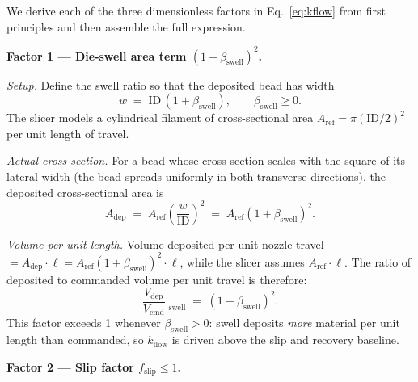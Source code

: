 \documentclass[11pt,a4paper]{article}
\begin{document}
\begin{derivationbox}[title={DERIVATION --- Each factor in $k_\mathrm{flow}=(1+\beta_\mathrm{swell})^2 f_\mathrm{slip}\sqrt{R_\mathrm{rec}}$}]
We derive each of the three dimensionless factors in Eq.~\ref{eq:kflow}
from first principles and then assemble the full expression.

\medskip\noindent\textbf{Factor 1 --- Die-swell area term
$(1+\beta_\mathrm{swell})^{2}$.}

\emph{Setup.} Define the swell ratio so that the deposited bead has
width
\begin{equation}
w \;=\; \mathrm{ID}\,(1+\beta_\mathrm{swell}),
\qquad \beta_\mathrm{swell}\geq 0.
\label{eq:swell_width}
\end{equation}
The slicer models a cylindrical filament of cross-sectional area
$A_\mathrm{ref}=\pi(\mathrm{ID}/2)^{2}$ per unit length of travel.

\emph{Actual cross-section.}
For a bead whose cross-section scales with the square of its lateral
width (the bead spreads uniformly in both transverse directions), the
deposited cross-sectional area is
\begin{equation}
A_\mathrm{dep}
\;=\; A_\mathrm{ref}\left(\frac{w}{\mathrm{ID}}\right)^{2}
\;=\; A_\mathrm{ref}(1+\beta_\mathrm{swell})^{2}.
\label{eq:Adep}
\end{equation}

\emph{Volume per unit length.}
Volume deposited per unit nozzle travel $= A_\mathrm{dep}\cdot\ell
= A_\mathrm{ref}(1+\beta_\mathrm{swell})^{2}\cdot\ell$,
while the slicer assumes $A_\mathrm{ref}\cdot\ell$. The ratio of
deposited to commanded volume per unit travel is therefore:
\begin{equation}
\frac{V_\mathrm{dep}}{V_\mathrm{cmd}}\Bigg|_\mathrm{swell}
\;=\; (1+\beta_\mathrm{swell})^{2}.
\label{eq:swell_factor}
\end{equation}
This factor exceeds 1 whenever $\beta_\mathrm{swell}>0$: swell deposits
\emph{more} material per unit length than commanded, so $k_\mathrm{flow}$
is driven above the slip and recovery baseline.

\medskip\noindent\textbf{Factor 2 --- Slip factor $f_\mathrm{slip}\leq 1$.}


\end{derivationbox}
\end{document}
